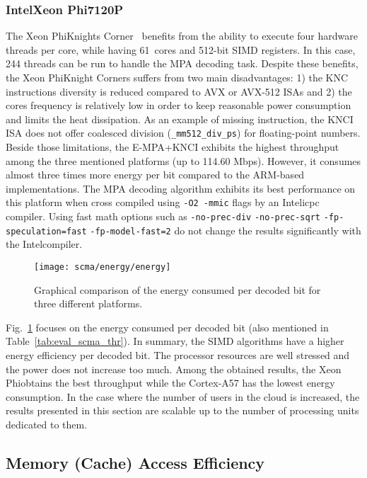 \subsubsection{Intel\R Xeon Phi\TM 7120P}

The Xeon Phi\TM Knights Corner~\cite{Chrysos2012} benefits from the ability to
execute four hardware threads per core, while having 61~cores and 512-bit SIMD
registers. In this case, 244 threads can be run to handle the MPA decoding task.
Despite these benefits, the Xeon Phi\TM Knight Corners suffers from two main
disadvantages: 1) the KNC instructions diversity is reduced compared to AVX or
AVX-512 ISAs and 2) the cores frequency is relatively low in order to keep
reasonable power consumption and limits the heat dissipation. As an example of
missing instruction, the KNCI ISA does not offer coalesced division
(\verb|_mm512_div_ps|) for floating-point numbers. Beside those limitations,
the E-MPA+KNCI exhibits the highest throughput among the three mentioned
platforms (up to 114.60 Mbps). However, it consumes almost three times more
energy per bit compared to the ARM\R-based implementations. The MPA decoding
algorithm exhibits its best performance on this platform when cross compiled
using \verb|-O2 -mmic| flags by an Intel\R icpc compiler. Using fast math
options such as \verb|-no-prec-div| \verb|-no-prec-sqrt|
\verb|-fp-speculation=fast| \verb|-fp-model-fast=2| do not change the results
significantly with the Intel\R compiler.

\begin{figure}[htp]
  \centering
  \texttt{[image: scma/energy/energy]}
  \caption{Graphical comparison of the energy consumed per decoded bit for
           three different platforms.}
  \label{plot:eval_scma_energy}
\end{figure}

Fig.~\ref{plot:eval_scma_energy} focuses on the energy consumed per decoded bit
(also mentioned in Table~\ref{tab:eval_scma_thr}). In summary, the SIMD
algorithms have a higher energy efficiency per decoded bit. The processor
resources are well stressed and the power does not increase too much. Among the
obtained results, the Xeon Phi\TM obtains the best throughput while the
Cortex-A57 has the lowest energy consumption. In the case where the number of
users in the cloud is increased, the results presented in this section are
scalable up to the number of processing units dedicated to them.

\subsection{Memory (Cache) Access Efficiency}
\label{sec:eval_scma_memory}

